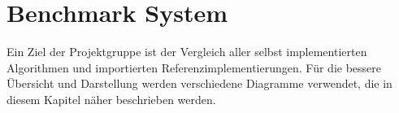 \section{Benchmark System}
\label{framework:benchmarks}

Ein  Ziel der Projektgruppe \sacabench ist der Vergleich aller selbst implementierten Algorithmen und importierten Referenzimplementierungen. Für die bessere Übersicht und Darstellung werden verschiedene Diagramme verwendet, die in diesem Kapitel näher beschrieben werden.






